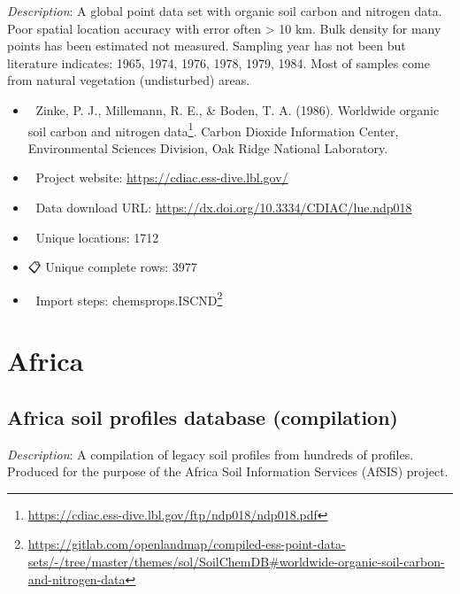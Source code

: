 \documentclass[
  graybox,natbib,nospthms]{svmono}
\providecommand{\tightlist}{%
  \setlength{\itemsep}{0pt}\setlength{\parskip}{0pt}}
\providecommand{\tightlist}{\setlength{\itemsep}{0pt}\setlength{\parskip}{0pt}}
\renewcommand{\href}[2]{#2 (\url{#1})}
\renewcommand{\href}[2]{#2\footnote{\url{#1}}}
\begin{document}
\emph{Description}: A global point data set with organic soil carbon and nitrogen data.
Poor spatial location accuracy with error often \textgreater{} 10 km. Bulk density for many points has been
estimated not measured. Sampling year has not been but literature indicates:
1965, 1974, 1976, 1978, 1979, 1984. Most of samples come from natural vegetation (undisturbed) areas.

\begin{itemize}
\tightlist
\item
  📕 Zinke, P. J., Millemann, R. E., \& Boden, T. A. (1986). \href{https://cdiac.ess-dive.lbl.gov/ftp/ndp018/ndp018.pdf}{Worldwide organic soil carbon and nitrogen data}. Carbon Dioxide Information Center, Environmental Sciences Division, Oak Ridge National Laboratory.\\
\item
  🔗 Project website: \url{https://cdiac.ess-dive.lbl.gov/}\\
\item
  📂 Data download URL: \url{https://dx.doi.org/10.3334/CDIAC/lue.ndp018}\\
\item
  📍 Unique locations: 1712\\
\item
  📋 Unique complete rows: 3977\\
\item
  📝 Import steps: \href{https://gitlab.com/openlandmap/compiled-ess-point-data-sets/-/tree/master/themes/sol/SoilChemDB\#worldwide-organic-soil-carbon-and-nitrogen-data}{chemsprops.ISCND}
\end{itemize}

\hypertarget{africa}{%
\section{Africa}\label{africa}}

\hypertarget{africa-soil-profiles-database-compilation}{%
\subsection{Africa soil profiles database (compilation)}\label{africa-soil-profiles-database-compilation}}

\emph{Description}: A compilation of legacy soil profiles from hundreds of profiles.
Produced for the purpose of the Africa Soil Information Services (AfSIS) project.
\end{document}

